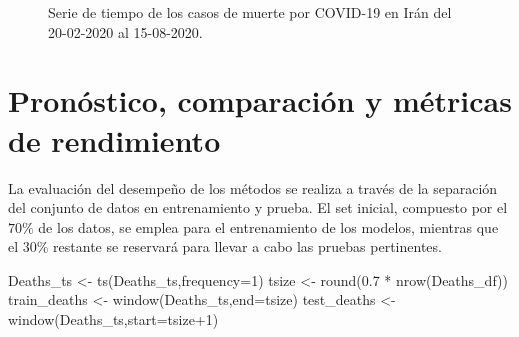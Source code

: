 \documentclass[
  us-letterpaper,
]{scrreprt}
\newenvironment{Shaded}{\begin{snugshade}}{\end{snugshade}}
\newcommand{\AttributeTok}[1]{\textcolor[rgb]{0.40,0.45,0.13}{#1}}
\newcommand{\DecValTok}[1]{\textcolor[rgb]{0.68,0.00,0.00}{#1}}
\newcommand{\FloatTok}[1]{\textcolor[rgb]{0.68,0.00,0.00}{#1}}
\newcommand{\FunctionTok}[1]{\textcolor[rgb]{0.28,0.35,0.67}{#1}}
\newcommand{\NormalTok}[1]{\textcolor[rgb]{0.00,0.23,0.31}{#1}}
\newcommand{\OtherTok}[1]{\textcolor[rgb]{0.00,0.23,0.31}{#1}}
\newcommand{\SpecialCharTok}[1]{\textcolor[rgb]{0.37,0.37,0.37}{#1}}
\theoremstyle{plain}
\theoremstyle{definition}
\theoremstyle{definition}
\theoremstyle{plain}
\theoremstyle{remark}
\begin{document}
\begin{figure}


\caption{\label{fig-muertespdf}Serie de tiempo de los casos de muerte
por COVID-19 en Irán del 20-02-2020 al 15-08-2020.}

\end{figure}%

\section{Pronóstico, comparación y métricas de
rendimiento}\label{pronuxf3stico-comparaciuxf3n-y-muxe9tricas-de-rendimiento}

La evaluación del desempeño de los métodos se realiza a través de la
separación del conjunto de datos en entrenamiento y prueba. El set
inicial, compuesto por el \(70\%\) de los datos, se emplea para el
entrenamiento de los modelos, mientras que el \(30\%\) restante se
reservará para llevar a cabo las pruebas pertinentes.

\begin{Shaded}
\begin{Highlighting}[]
\NormalTok{Deaths\_ts }\OtherTok{\textless{}{-}} \FunctionTok{ts}\NormalTok{(Deaths\_ts,}\AttributeTok{frequency=}\DecValTok{1}\NormalTok{) }
\NormalTok{tsize }\OtherTok{\textless{}{-}} \FunctionTok{round}\NormalTok{(}\FloatTok{0.7} \SpecialCharTok{*} \FunctionTok{nrow}\NormalTok{(Deaths\_df)) }
\NormalTok{train\_deaths }\OtherTok{\textless{}{-}} \FunctionTok{window}\NormalTok{(Deaths\_ts,}\AttributeTok{end=}\NormalTok{tsize) }
\NormalTok{test\_deaths }\OtherTok{\textless{}{-}} \FunctionTok{window}\NormalTok{(Deaths\_ts,}\AttributeTok{start=}\NormalTok{tsize}\SpecialCharTok{+}\DecValTok{1}\NormalTok{)}
\end{Highlighting}
\end{Shaded}
\end{document}
